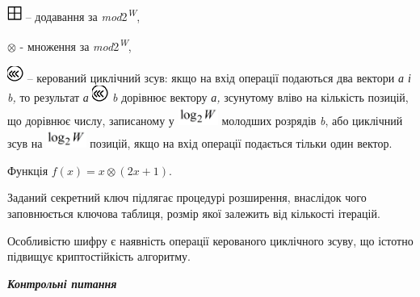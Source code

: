 \documentclass[a4paper]{article}
\newcounter{}
\begin{document}
  \includegraphics[width=0.1874in,height=0.1874in]{crypt-img/crypt-img306.png} 
– додавання за \textit{mod}2\textit{\textsuperscript{W}}, 

  ${{\otimes}}$ - множення за \textit{mod}2\textit{\textsuperscript{W}},

 \includegraphics[width=0.2083in,height=0.2083in]{crypt-img/crypt-img307.png}  –
керований циклічний зсув: якщо на вхід операції подаються два вектори \textit{а
і }\textit{b}\textit{,} то результат  \textit{а}
\includegraphics[width=0.2083in,height=0.2083in]{crypt-img/crypt-img308.png}
\textit{ }\textit{b}\textit{ }дорівнює вектору \textit{а,} зсунутому вліво на
кількість позицій, що дорівнює числу, записаному у 
\includegraphics[width=0.5138in,height=0.25in]{crypt-img/crypt-img309.png} 
молодших розрядів \textit{b},\textit{ }або циклічний зсув на 
\includegraphics[width=0.5138in,height=0.25in]{crypt-img/crypt-img310.png}
позицій, якщо на вхід операції подається тільки один вектор.


\bigskip


\bigskip


\bigskip

Функція  ${f(x)=x{\otimes}(2x+1)}$.

Заданий секретний ключ підлягає процедурі розширення, внаслідок чого
заповнюється ключова таблиця, розмір якої залежить від кількості ітерацій.

Особливістю шифру є наявність операції керованого циклічного зсуву, що істотно
підвищує криптостійкість алгоритму.


\bigskip


\bigskip

{\centering\bfseries\itshape
Контрольні питання
\par}


\bigskip


\bigskip
\end{document}
